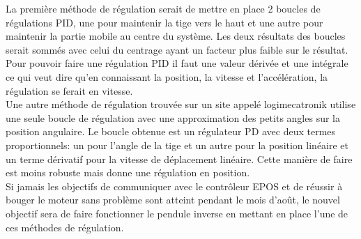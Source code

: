 La première méthode de régulation serait de mettre en place 2 boucles de régulations PID, une pour maintenir la tige vers le haut et une autre pour
maintenir la partie mobile au centre du système. Les deux résultats des boucles serait sommés avec celui du centrage ayant un facteur plus faible
sur le résultat. Pour pouvoir faire une régulation PID il faut une valeur dérivée et une intégrale ce qui veut dire qu'en connaissant la position,
la vitesse et l'accélération, la régulation se ferait en vitesse.\\

Une autre méthode de régulation trouvée sur un site appelé logimecatronik \cite{logimecatronik} utilise une seule boucle de régulation avec une
approximation des petits angles sur la position angulaire. Le boucle obtenue est un régulateur PD avec deux termes proportionnels: un pour l'angle
de la tige et un autre pour la position linéaire et un terme dérivatif pour la vitesse de déplacement linéaire. Cette manière de faire est moins
robuste mais donne une régulation en position.\\

Si jamais les objectifs de communiquer avec le contrôleur EPOS et de réussir à bouger le moteur sans problème sont atteint pendant le mois d'août,
le nouvel objectif sera de faire fonctionner le pendule inverse en mettant en place l'une de ces méthodes de régulation.


